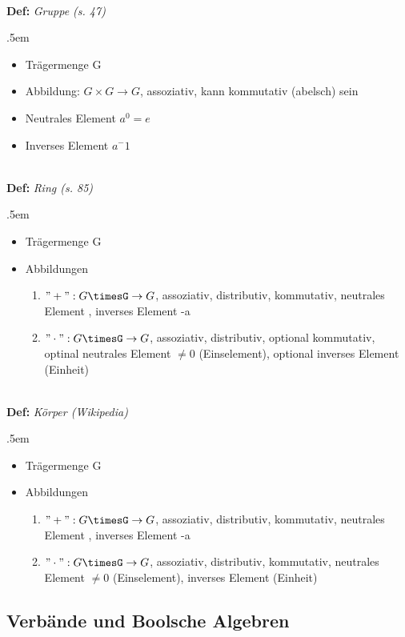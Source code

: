 \documentclass[twocolumn, 10pt]{article}
\newenvironment {definition}
                [1][]
                {\noindent\\{\bf
                Def:}\emph{
                #1}\indent\begin{addmargin}{.5em}}{\end{addmargin}}
\begin{document}
\begin{definition}[Gruppe (s. 47)]
\begin{itemize}
  \item Trägermenge G
  \item Abbildung: $G \times G \rightarrow G$, assoziativ, kann kommutativ
  (abelsch) sein
  \item Neutrales Element $a^0 = e$
  \item Inverses Element $a^-1$
\end{itemize}
\end{definition}

\begin{definition}[Ring (s. 85)]
\begin{itemize}
  \item Trägermenge G
  \item Abbildungen
  	\begin{enumerate}
    	\item $"+": G\timesG \rightarrow G$, assoziativ, distributiv, kommutativ,
    	neutrales Element \grqq, inverses Element \glqq -a\grqq
    	\item $"\cdot": G\timesG \rightarrow G$, assoziativ, distributiv, optional
    	kommutativ, optinal neutrales Element $\neq 0$ (\glqq Einselement\grqq),
    	optional inverses Element (\glqq Einheit\grqq)
  	\end{enumerate}
\end{itemize}
\end{definition}

\begin{definition}[Körper (Wikipedia)]
\begin{itemize}
  \item Trägermenge G
  \item Abbildungen
  	\begin{enumerate}
    	\item $"+": G\timesG \rightarrow G$, assoziativ, distributiv, kommutativ,
    	neutrales Element \grqq, inverses Element \glqq -a\grqq
    	\item $"\cdot": G\timesG \rightarrow G$, assoziativ, distributiv, kommutativ, neutrales Element $\neq 0$ (\glqq Einselement\grqq),
    	inverses Element (\glqq Einheit\grqq)
  	\end{enumerate}
\end{itemize}
\end{definition}



\subsection*{Verbände und Boolsche Algebren}
\end{document}
